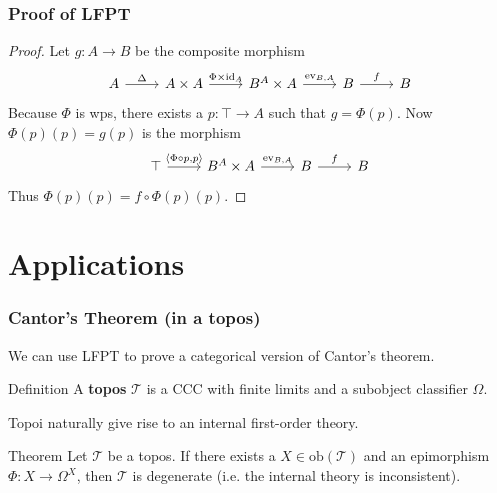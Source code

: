\documentclass{beamer}
\begin{document}
\begin{frame}[fragile]
  \frametitle{Proof of LFPT}
  \begin{proof}
    Let $g : A \rightarrow B$ be the composite morphism
    \[\begin{tikzcd}
	    A & {A \times A} & {B^A\times A} & {B} & {B}
	    \arrow["\Delta", from=1-1, to=1-2]
	    \arrow["{\Phi \times \text{id}_A}", from=1-2, to=1-3]
	    \arrow["{\text{ev}_{B,A}}", from=1-3, to=1-4]
      \arrow["f", from=1-4, to=1-5]
    \end{tikzcd}\]
    Because $\Phi$ is wps, there exists a $p : \top \rightarrow A$ such that $g = \Phi(p)$. Now $\Phi(p)(p) = g(p)$ is the morphism
    \[\begin{tikzcd}
	    \top & {B^A \times A} & {B} & {B}
	    \arrow["{\langle \Phi \circ p, p \rangle}", from=1-1, to=1-2]
	    \arrow["{\text{ev}_{B,A}}", from=1-2, to=1-3]
      \arrow["f", from=1-3, to=1-4]
    \end{tikzcd}\]
  Thus $\Phi(p)(p) = f \circ \Phi(p)(p)$.
  \end{proof}
\end{frame}

\section{Applications}

\begin{frame}
  \frametitle{Cantor's Theorem (in a topos)}
  We can use LFPT to prove a categorical version of Cantor's theorem.
  \begin{block}{Definition}
    A \textbf{topos} $\mathcal{T}$ is a CCC with finite limits and a subobject classifier $\Omega$.
  \end{block}
  Topoi naturally give rise to an internal first-order theory.
  \begin{alertblock}{Theorem}
    Let $\mathcal{T}$ be a topos. If there exists a $X \in \text{ob}(\mathcal{T})$ and an epimorphism $\Phi : X \rightarrow \Omega ^ X$, then $\mathcal{T}$ is degenerate (i.e. the internal theory is inconsistent).
  \end{alertblock}
\end{frame}
\end{document}
